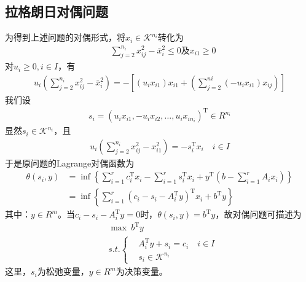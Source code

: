     \subsection{拉格朗日对偶问题}
        \par
        为得到上述问题的对偶形式，将$x_i \in \mathcal{K}^{n_i}$转化为
        \begin{align*}
          & \mathop{\sum} \limits_{j=2}^{n_i}x_{ij}^2-{\bar{x}}_i^2\leqslant 0\text{及} x_{i1}\geqslant 0
        \end{align*}
        对$u_i\geqslant 0,i \in I$，有
        \begin{align*}
          u_i \left( \mathop{\sum} \limits_{j=2}^{n_i}x_{ij}^2-{\bar{x}}_i^2 \right) =-\left[(u_ix_{i1})x_{i1}+\left( \mathop{\sum} \limits_{j=2}^{ni}(-u_ix_{i1})x_{ij} \right) \right]
        \end{align*}
        我们设
        \begin{align*}
         s_i=(u_ix_{i1},-u_ix_{i2},\ldots,u_ix_{in_i})^\mathrm{T} \in R^{n_i}
        \end{align*}
        显然$s_i \in \mathcal{K}^{n_i}$，且
        \begin{align*}
         u_i \left( \mathop{\sum} \limits_{j=2}^{n_i}x_{ij}^2-x_{i1}^2 \right) =-s_i^\mathrm{T} x_i \quad i \in I
        \end{align*}
        于是原问题的Lagrange对偶函数为
        \begin{align*}
         \theta(s_i,y)&=\inf\left\{\mathop{\sum} \limits_{i=1}^{r}c_i^\mathrm{T} x_i-\mathop{\sum} \limits_{i=1}^{r}s_i^\mathrm{T} x_i+y^\mathrm{T} \left(b-\mathop{\sum} \limits_{i=1}^{r}A_ix_i\right)\right\}\\
         &=\inf\left\{\mathop{\sum} \limits_{i=1}^{r}(c_i-s_i-A_i^\mathrm{T} y)^\mathrm{T} x_i+b^\mathrm{T} y\right\}
        \end{align*}
        其中：$y \in R^m$。当$c_i-s_i-A_i^\mathrm{T} y=0$时，$\theta(s_i,y)=b^\mathrm{T} y$，故对偶问题可描述为
        \begin{align*}
          & \mathop{\max}\ b^\mathrm{T} y\\
          & s.t.\left\{
            \begin{aligned}
          & A_i^\mathrm{T} y+s_i=c_i \quad i\in I\\
          & s_i \in \mathcal{K}^{n_i}
            \end{aligned}
             \right.
        \end{align*}
        这里，$s_i$为松弛变量，$y \in R^{m}$为决策变量。
